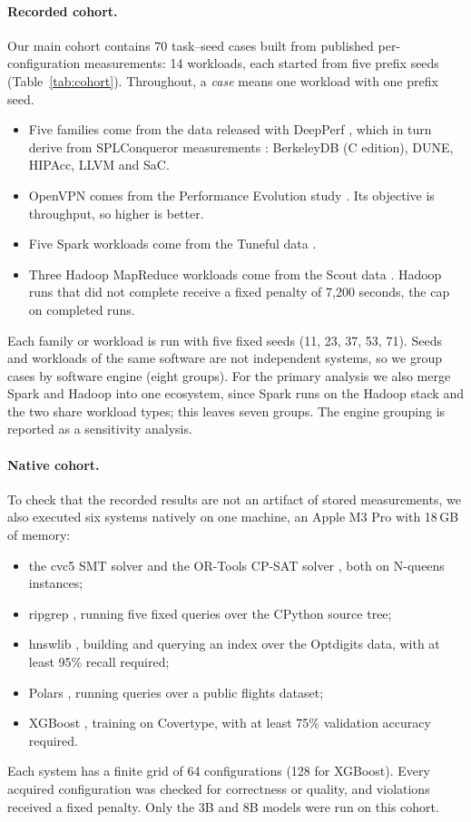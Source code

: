 \paragraph{Recorded cohort.} Our main cohort contains 70 task--seed cases built from published per-configuration measurements: 14 workloads, each started from five prefix seeds (Table~\ref{tab:cohort}). Throughout, a \emph{case} means one workload with one prefix seed.
\begin{itemize}
  \item Five families come from the data released with DeepPerf \cite{ha2019deepperf}, which in turn derive from SPLConqueror measurements \cite{siegmund2015influence}: BerkeleyDB (C edition), DUNE, HIPAcc, LLVM and SaC.
  \item OpenVPN comes from the Performance Evolution study \cite{kaltenecker2023evolution}. Its objective is throughput, so higher is better.
  \item Five Spark workloads come from the Tuneful data \cite{fekry2020tuneful}.
  \item Three Hadoop MapReduce workloads come from the Scout data \cite{hsu2018scout}. Hadoop runs that did not complete receive a fixed penalty of 7,200 seconds, the cap on completed runs.
\end{itemize}
Each family or workload is run with five fixed seeds (11, 23, 37, 53, 71). Seeds and workloads of the same software are not independent systems, so we group cases by software engine (eight groups). For the primary analysis we also merge Spark and Hadoop into one ecosystem, since Spark runs on the Hadoop stack and the two share workload types; this leaves seven groups. The engine grouping is reported as a sensitivity analysis.

\paragraph{Native cohort.} To check that the recorded results are not an artifact of stored measurements, we also executed six systems natively on one machine, an Apple M3 Pro with 18\,GB of memory:
\begin{itemize}
  \item the cvc5 SMT solver \cite{barbosa2022cvc5} and the OR-Tools CP-SAT solver \cite{perron2023ortools}, both on N-queens instances;
  \item ripgrep \cite{gallant2016ripgrep}, running five fixed queries over the CPython source tree;
  \item hnswlib \cite{malkov2020hnsw}, building and querying an index over the Optdigits data, with at least 95\% recall required;
  \item Polars \cite{vink2020polars}, running queries over a public flights dataset;
  \item XGBoost \cite{chen2016xgboost}, training on Covertype, with at least 75\% validation accuracy required.
\end{itemize}
Each system has a finite grid of 64 configurations (128 for XGBoost). Every acquired configuration was checked for correctness or quality, and violations received a fixed penalty. Only the 3B and 8B models were run on this cohort.

